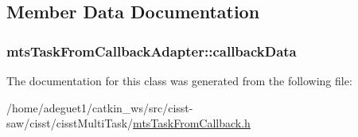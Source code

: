 \subsection{Member Data Documentation}
\hypertarget{classmts_task_from_callback_adapter_aa7f1cc998e5366d8c3eebc802f9d7652}{
\subsubsection[{callback\-Data}]{ mts\-Task\-From\-Callback\-Adapter\-::callback\-Data\hspace{0.3cm}{\ttfamily [protected]}}}\label{classmts_task_from_callback_adapter_aa7f1cc998e5366d8c3eebc802f9d7652}


The documentation for this class was generated from the following file\-:\begin{DoxyCompactItemize}
\item 
/home/adeguet1/catkin\-\_\-ws/src/cisst-\/saw/cisst/cisst\-Multi\-Task/\hyperlink{mts_task_from_callback_8h}{mts\-Task\-From\-Callback.\-h}\end{DoxyCompactItemize}
